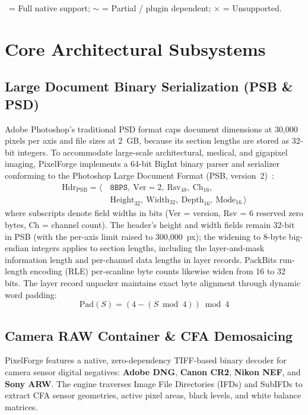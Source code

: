 \documentclass[10pt,journal,compsoc]{IEEEtran}
\begin{document}
\begin{table}[!t]
\smallskip
\begin{flushleft}
\scriptsize \checkmark\ = Full native support; $\sim$ = Partial / plugin dependent; $\times$ = Unsupported.
\end{flushleft}
\end{table}

\section{Core Architectural Subsystems}

\subsection{Large Document Binary Serialization (PSB \& PSD)}
Adobe Photoshop's traditional PSD format caps document dimensions at 30{,}000 pixels per axis and file sizes at 2~GB, because its section lengths are stored as 32-bit integers. To accommodate large-scale architectural, medical, and gigapixel imaging, PixelForge implements a 64-bit BigInt binary parser and serializer conforming to the Photoshop Large Document Format (PSB, version~2)~\cite{adobe2020psd}:
\begin{equation}
\begin{aligned}
\text{Hdr}_{\text{PSB}} = \big\langle\, & \texttt{8BPS},\ \text{Ver}{=}2,\ \text{Rsv}_{48},\ \text{Ch}_{16}, \\
& \text{Height}_{32},\ \text{Width}_{32},\ \text{Depth}_{16},\ \text{Mode}_{16} \,\big\rangle
\end{aligned}
\end{equation}
where subscripts denote field widths in bits (Ver = version, Rsv = 6 reserved zero bytes, Ch = channel count). The header's height and width fields remain 32-bit in PSB (with the per-axis limit raised to 300{,}000~px); the widening to 8-byte big-endian integers applies to section lengths, including the layer-and-mask information length and per-channel data lengths in layer records. PackBits run-length encoding (RLE) per-scanline byte counts likewise widen from 16 to 32 bits. The layer record unpacker maintains exact byte alignment through dynamic word padding:
\begin{equation}
\text{Pad}(S) = (4 - (S \bmod 4)) \bmod 4
\end{equation}

\subsection{Camera RAW Container \& CFA Demosaicing}
PixelForge features a native, zero-dependency TIFF-based binary decoder for camera sensor digital negatives: \textbf{Adobe DNG}, \textbf{Canon CR2}, \textbf{Nikon NEF}, and \textbf{Sony ARW}. The engine traverses Image File Directories (IFDs) and SubIFDs to extract CFA sensor geometries, active pixel areas, black levels, and white balance matrices.
\end{document}
